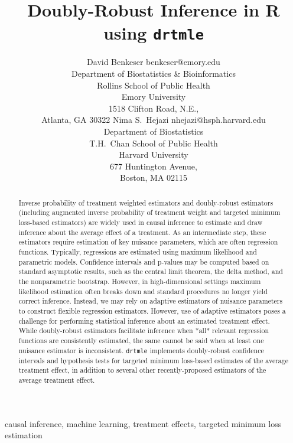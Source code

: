 \documentclass[twoside,11pt]{article}
\begin{document}
\title{Doubly-Robust Inference in R using \texttt{drtmle}}

\author{
  \name David Benkeser \email benkeser@emory.edu\\
  \addr Department of Biostatistics \& Bioinformatics\\
  Rollins School of Public Health\\
  Emory University\\
  1518 Clifton Road, N.E.,\\
  Atlanta, GA 30322
  \AND
  \name Nima S.~Hejazi \email nhejazi@hsph.harvard.edu\\
  \addr Department of Biostatistics\\
  T.H.~Chan School of Public Health\\
  Harvard University\\
  677 Huntington Avenue,\\
  Boston, MA 02115
}

\maketitle

\begin{abstract}
  Inverse probability of treatment weighted estimators and doubly-robust
  estimators (including augmented inverse probability of treatment weight and
  targeted minimum loss-based estimators) are widely used in causal inference to
  estimate and draw inference about the average effect of a treatment. As an
  intermediate step, these estimators require estimation of key nuisance
  parameters, which are often regression functions. Typically, regressions are
  estimated using maximum likelihood and parametric models. Confidence intervals
  and p-values may be computed based on standard asymptotic results, such as the
  central limit theorem, the delta method, and the nonparametric bootstrap.
  However, in high-dimensional settings maximum likelihood estimation often
  breaks down and standard procedures no longer yield correct inference.
  Instead, we may rely on adaptive estimators of nuisance parameters to
  construct flexible regression estimators. However, use of adaptive estimators
  poses a challenge for performing statistical inference about an estimated
  treatment effect. While doubly-robust estimators facilitate inference when
  *all* relevant regression functions are consistently estimated, the same
  cannot be said when at least one nuisance estimator is inconsistent.
  \texttt{drtmle} implements doubly-robust confidence intervals and hypothesis
  tests for targeted minimum loss-based estimates of the average treatment
  effect, in addition to several other recently-proposed estimators of the
  average treatment effect.
\end{abstract}

\begin{keywords}
  causal inference, machine learning, treatment effects, targeted minimum
  loss estimation
\end{keywords}
\end{document}
